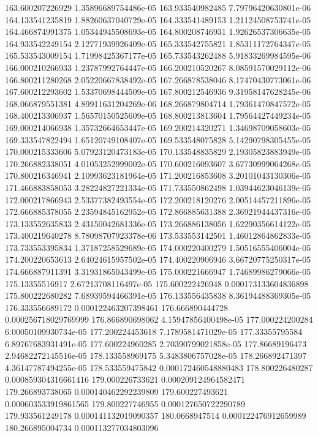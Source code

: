 {163.600207226929 1.35896689754486e-05
163.933540982485 7.79796420630801e-06
164.133541235819 1.88260637040729e-05
164.333541489153 1.21124508753741e-05
164.466874991375 1.05344945508693e-05
164.800208746931 1.92626537306635e-05
164.933542249154 2.12771939926409e-05
165.333542755821 1.85311172764347e-05
165.533543009154 1.71998425367177e-05
165.733543262488 5.91833269984595e-06
166.000210266933 1.23787992764447e-05
166.200210520267 8.08591570029112e-06
166.800211280268 2.05220667838492e-05
167.266878538046 8.17470430773061e-06
167.600212293602 1.53370698444509e-05
167.800212546936 9.31958147628245e-06
168.066879551381 4.89911631204269e-06
168.266879804714 1.79361470847572e-05
168.400213306937 1.56570150525609e-05
168.800213813604 1.79564427449234e-05
169.000214066938 1.35732664653447e-05
169.200214320271 1.34698709058603e-05
169.333547822494 1.65120749108407e-05
169.533548075828 5.14290798305455e-05
170.000215333606 5.07923120473183e-05
170.133548835829 2.19305823883949e-05
170.266882338051 4.01053252999002e-05
170.600216093607 3.67730999064268e-05
170.800216346941 2.10993623181964e-05
171.200216853608 3.20101043130306e-05
171.466883858053 3.28224827221334e-05
171.733550862498 1.03944623046139e-05
172.000217866943 2.53377382493554e-05
172.200218120276 2.00514457211896e-05
172.666885378055 2.23594845162952e-05
172.866885631388 2.36921944437316e-05
173.133552635833 2.43150042681336e-05
173.266886138056 1.62290356614122e-05
173.400219640278 8.78098707923378e-06
173.533553142501 1.46012864862833e-05
173.733553395834 1.37187258529689e-05
174.000220400279 1.50516555406004e-05
174.200220653613 2.64024615957502e-05
174.400220906946 3.66720775250317e-05
174.666887911391 3.31931865043499e-05
175.000221666947 1.74689986279066e-05
175.13355516917 2.67213708116497e-05
175.600222426948 0.000173133604836898
175.800222680282 7.68939594466391e-05
176.133556435838 8.36194488369305e-05
176.333556689172 0.000122463207398461
176.666890444728 0.000256718029769999
176.866890698062 4.15947856400498e-05
177.000224200284 6.00050109930734e-05
177.200224453618 7.1789581471029e-05
177.33355795584 6.89767683931491e-05
177.600224960285 2.70390799021858e-05
177.86689196473 2.94682272145516e-05
178.133558969175 5.3483806757028e-05
178.266892471397 4.36147787494255e-05
178.533559475842 0.000172460548880483
178.800226480287 0.000859304316661416
179.000226733621 0.000209124964582471
179.266893738065 0.000140462292239809
179.600227493621 0.000603533919861565
179.800227746955 0.000127650722290789
179.933561249178 0.000141132019090357
180.0668947514 0.000122476912659989
180.266895004734 0.000113277034803096
}
